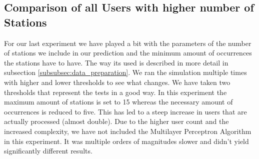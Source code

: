 \newpage
\subsection{Comparison of all Users with higher number of Stations}
For our last experiment we have played a bit with the parameters of the number of stations we include in our prediction and the minimum amount of occurrences the stations have to have. The way its used is described in more detail in subsection \ref{subsubsec:data_preparation}. We ran the simulation multiple times with higher and lower thresholds to see what changes. We have taken two thresholds that represent the tests in a good way. In this experiment the maximum amount of stations is set to 15 whereas the necessary amount of occurrences is reduced to five. This has led to a steep increase in users that are actually processed (almost double). Due to the higher user count and the increased complexity, we have not included the Multilayer Perceptron Algorithm in this experiment. It was multiple orders of magnitudes slower and didn't yield significantly different results. 


